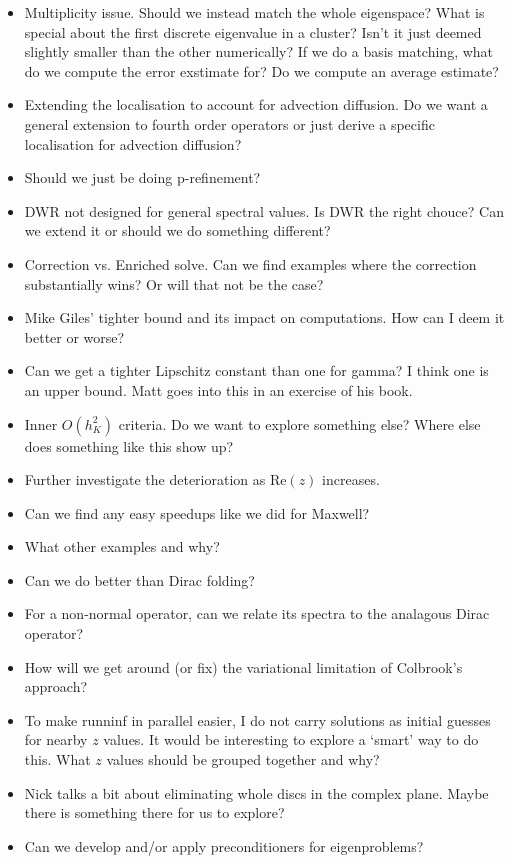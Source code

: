 \documentclass[12pt,a4paper]{article}
\begin{document}
\begin{itemize}
    \item Multiplicity issue. Should we instead match the whole eigenspace? What is special about the first discrete eigenvalue in a cluster? Isn't it just deemed slightly smaller than the other numerically? If we do a basis matching, what do we compute the error exstimate for? Do we compute an average estimate? 
    \item Extending the localisation to account for advection diffusion. Do we want a general extension to fourth order operators or just derive a specific localisation for advection diffusion?
    \item Should we just be doing p-refinement? 
    \item DWR not designed for general spectral values. Is DWR the right chouce? Can we extend it or should we do something different?
    \item Correction vs. Enriched solve. Can we find examples where the correction substantially wins? Or will that not be the case?
    \item Mike Giles' tighter bound and its impact on computations. How can I deem it better or worse? 
    \item Can we get a tighter Lipschitz constant than one for gamma? I think one is an upper bound. Matt goes into this in an exercise of his book. 
    \item Inner $O(h_K^2)$ criteria. Do we want to explore something else? Where else does something like this show up? 
    \item Further investigate the deterioration as $\text{Re}(z)$ increases. 
    \item Can we find any easy speedups like we did for Maxwell? 
    \item What other examples and why? 
    \item Can we do better than Dirac folding?
    \item For a non-normal operator, can we relate its spectra to the analagous Dirac operator? 
    \item How will we get around (or fix) the variational limitation of Colbrook's approach? 
    \item To make runninf in parallel easier, I do not carry solutions as initial guesses for nearby $z$ values. It would be interesting to explore a `smart' way to do this. What $z$ values  should be grouped together and why? 
    \item Nick talks a bit about eliminating whole discs in the complex plane. Maybe there is something there for us to explore? 
    \item Can we develop and/or apply preconditioners for eigenproblems? 
\end{itemize}
\end{document}
